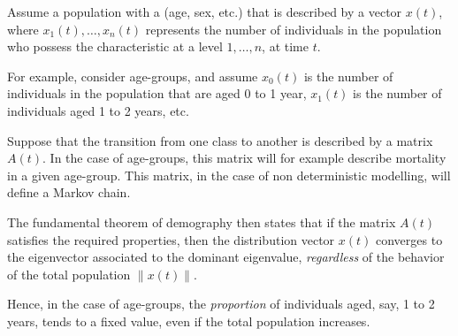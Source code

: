 \documentclass[12pt]{article}
\begin{document}

Assume a population with a  (age, sex, etc.) that is described by a vector $x(t)$, where $x_1(t),\ldots,x_n(t)$ represents the number of individuals in the population who possess the characteristic at a level $1,\ldots,n$, at time $t$.

For example, consider age-groups, and assume $x_0(t)$ is the number of individuals in the population that are aged 0 to 1 year, $x_1(t)$ is the number of individuals aged 1 to 2 years, etc.

Suppose that the transition from one class to another is described by a matrix $A(t)$. In the case of age-groups, this matrix will for example describe mortality in a given age-group. This matrix, in the case of non deterministic modelling, will define a Markov chain.

The fundamental theorem of demography then states that if the matrix $A(t)$ satisfies the required properties, then the distribution vector $x(t)$ converges to the eigenvector associated to the dominant eigenvalue, \emph{regardless} of the behavior of the total population $\|x(t)\|$.

Hence, in the case of age-groups, the \emph{proportion} of individuals aged, say, 1 to 2 years, tends to a fixed value, even if the total population increases.
\end{document}
